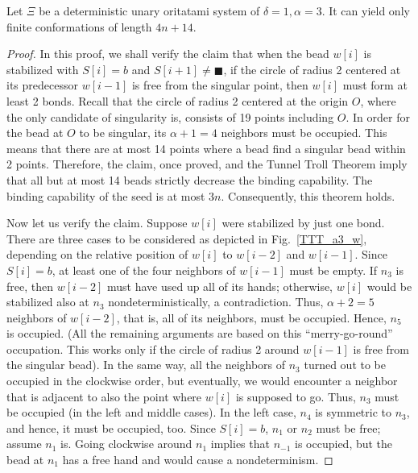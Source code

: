 

\begin{theorem}[$\delta = 1, \alpha = 3$]
Let $\Xi$ be a deterministic unary oritatami system of $\delta = 1, \alpha = 3$. It can yield only finite conformations of length $4n + 14$.
\end{theorem}



\begin{proof}
In this proof, we shall verify the claim that when the bead $w[i]$ is stabilized with $S[i] = b$ and $S[i+1] \neq \blacksquare$, if the circle of radius 2 centered at its predecessor $w[i-1]$ is free from the singular point, then $w[i]$ must form at least 2 bonds. 
Recall that the circle of radius 2 centered at the origin $O$, where the only candidate of singularity is, consists of 19 points including $O$. 
In order for the bead at $O$ to be singular, its $\alpha+1 = 4$ neighbors must be occupied. 
This means that there are at most 14 points where a bead find a singular bead within 2 points. 
Therefore, the claim, once proved, and the Tunnel Troll Theorem imply that all but at most 14 beads strictly decrease the binding capability. 
The binding capability of the seed is at most $3n$. 
Consequently, this theorem holds. 

Now let us verify the claim. 
Suppose $w[i]$ were stabilized by just one bond. 
There are three cases to be considered as depicted in Fig.~\ref{TTT_a3_w}, depending on the relative position of $w[i]$ to $w[i-2]$ and $w[i-1]$. 
Since $S[i] = b$, at least one of the four neighbors of $w[i-1]$ must be empty. 
If $n_3$ is free, then $w[i-2]$ must have used up all of its hands; otherwise, $w[i]$ would be stabilized also at $n_3$ nondeterministically, a contradiction. 
Thus, $\alpha + 2 = 5$ neighbors of $w[i-2]$, that is, all of its neighbors, must be occupied. 
Hence, $n_5$ is occupied. 
(All the remaining arguments are based on this ``merry-go-round'' occupation. This works only if the circle of radius 2 around $w[i-1]$ is free from the singular bead). 
In the same way, all the neighbors of $n_3$ turned out to be occupied in the clockwise order, but eventually, we would encounter a neighbor that is adjacent to also the point where $w[i]$ is supposed to go. 
Thus, $n_3$ must be occupied (in the left and middle cases). 
In the left case, $n_4$ is symmetric to $n_3$, and hence, it must be occupied, too. 
Since $S[i] = b$, $n_1$ or $n_2$ must be free; assume $n_1$ is. 
Going clockwise around $n_1$ implies that $n_{-1}$ is occupied, but the bead at $n_1$ has a free hand and would cause a nondeterminism. 


\end{proof}
